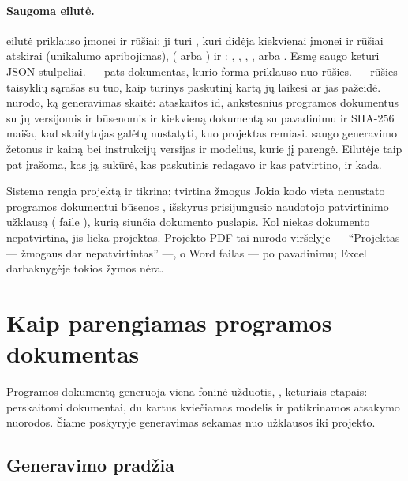 \paragraph{Saugoma eilutė.}  eilutė priklauso įmonei ir rūšiai; ji turi
, kuri didėja kiekvienai įmonei ir rūšiai atskirai (unikalumo apribojimas),
 ( arba ) ir : , ,
, ,  arba . Esmę saugo keturi JSON
stulpeliai.  --- pats dokumentas, kurio forma priklauso nuo rūšies.
 --- rūšies taisyklių sąrašas su tuo, kaip turinys paskutinį kartą jų laikėsi ar
jas pažeidė.  nurodo, ką generavimas skaitė: ataskaitos id, ankstesnius programos
dokumentus su jų versijomis ir būsenomis ir kiekvieną dokumentą su pavadinimu ir SHA-256
maiša, kad skaitytojas galėtų nustatyti, kuo projektas remiasi.  saugo
generavimo žetonus ir kainą bei instrukcijų versijas ir modelius, kurie jį parengė. Eilutėje
taip pat įrašoma, kas ją sukūrė, kas paskutinis redagavo ir kas patvirtino, ir kada.

\begin{humanbox}{Sistema rengia projektą ir tikrina; tvirtina žmogus}
Jokia kodo vieta nenustato programos dokumentui būsenos , išskyrus prisijungusio
naudotojo patvirtinimo užklausą ( faile ),
kurią siunčia dokumento puslapis. Kol niekas dokumento nepatvirtina, jis lieka projektas.
Projekto PDF tai nurodo viršelyje --- \enquote{Projektas --- žmogaus dar nepatvirtintas} ---,
o Word failas --- po pavadinimu; Excel darbaknygėje tokios žymos nėra.
\end{humanbox}


\section{Kaip parengiamas programos dokumentas}\label{sec:programme:generation}

Programos dokumentą generuoja viena foninė užduotis, , keturiais
etapais: perskaitomi dokumentai, du kartus kviečiamas modelis ir patikrinamos atsakymo
nuorodos. Šiame poskyryje generavimas sekamas nuo užklausos iki projekto.

\subsection{Generavimo pradžia}

